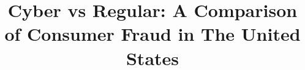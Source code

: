 \documentclass[conference]{IEEEtran}
\begin{document}
%
\title{Cyber vs Regular: A Comparison of Consumer Fraud in The United States}






% 








\maketitle
\end{document}

